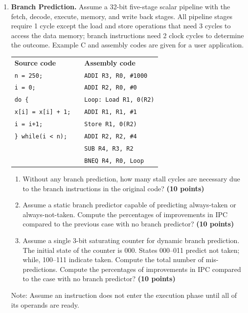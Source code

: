 \documentclass[a4paper, 11pt]{exam}
\begin{document}
\begin{center}
{{{\begin{enumerate}
\item \textbf{Branch Prediction.}
Assume a 32-bit five-stage scalar pipeline with the fetch, decode, execute, memory, and write back stages.
All pipeline stages require 1 cycle except the load and store operations that need 3 cycles to access the data memory; branch instructions need 2 clock cycles to determine the outcome.
Example C and assembly codes are given for a user application.

\begin{tabular}{lll}
	\textbf{Source code} & & \textbf{Assembly code }\\
	\texttt{n = 250;}&  &\hspace{40pt}\texttt{ADDI R3, R0, \#1000} \\
	\texttt{i = 0;} &  &\hspace{40pt}\texttt{ADDI R2, R0, \#0}\\
	\texttt{do \{} &  &\texttt{Loop: Load  R1, 0(R2)} \\
	\hspace{20pt}\texttt{x[i] = x[i] + 1;}&  &\hspace{40pt}\texttt{ADDI   R1, R1, \#1}\\
	\hspace{20pt}\texttt{i = i+1;}&  &\hspace{40pt}\texttt{Store  R1, 0(R2)}\\
	\texttt{\} while(i < n);}&  &\hspace{40pt}\texttt{ADDI R2, R2, \#4}\\
	&  &\hspace{40pt}\texttt{SUB R4, R3, R2}\\
	&  &\hspace{40pt}\texttt{BNEQ R4, R0, Loop}\\
\end{tabular}

\begin{enumerate}
	\item  Without any branch prediction, how many stall cycles are necessary due to the branch instructions in the original code? \textbf {(10 points)}
    \item  Assume a static branch predictor capable of predicting always-taken or always-not-taken. Compute the percentages of improvements in IPC compared to the previous case with no branch predictor? \textbf {(10 points)}
   \item Assume a single 3-bit saturating counter for dynamic branch prediction. The initial state of the counter is 000. States 000--011 predict not taken; while, 100--111 indicate taken. Compute the total number of mis-predictions. Compute the percentages of improvements in IPC compared to the case with no branch predictor? \textbf {(10 points)}
\end{enumerate}
Note: Assume an instruction does not enter the execution phase until all of its operands are ready.




\end{enumerate}}}}
\end{center}
\end{document}

